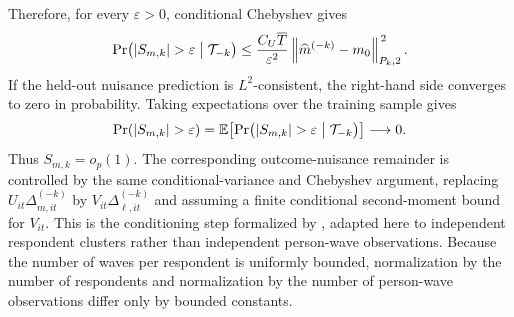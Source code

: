 \documentclass[11pt,oneside,a4paper]{book}
\begin{document}
Therefore, for every \(\varepsilon>0\), conditional Chebyshev gives
\begin{equation}
\Pr\!\left(
\lvert S_{m,k}\rvert>\varepsilon
\bigm|\mathcal{T}_{-k}
\right)
\leq
\frac{C_U\overline{T}}{\varepsilon^2}
\left\|
\widehat{m}^{(-k)}-m_0
\right\|_{P_k,2}^{\,2}.
\label{eq:crossfit_chebyshev_m}
\end{equation}
If the held-out nuisance prediction is \(L^2\)-consistent, the right-hand side converges to zero in probability. Taking expectations over the training sample gives
\begin{equation}
\Pr\!\left(\lvert S_{m,k}\rvert>\varepsilon\right)
=
\mathbb{E}\!\left[
\Pr\!\left(
\lvert S_{m,k}\rvert>\varepsilon
\bigm|\mathcal{T}_{-k}
\right)
\right]
\longrightarrow 0.
\label{eq:crossfit_unconditional_convergence}
\end{equation}
Thus \(S_{m,k}=o_p(1)\). The corresponding outcome-nuisance remainder is controlled by the same conditional-variance and Chebyshev argument, replacing \(U_{it}\Delta^{(-k)}_{m,it}\) by \(V_{it}\Delta^{(-k)}_{\ell,it}\) and assuming a finite conditional second-moment bound for \(V_{it}\). This is the conditioning step formalized by \citet[Appendix, p.~C50, Lemma~6.1, titled \emph{Conditional convergence implies unconditional}; pp.~C55--C56]{chernozhukov2018dml}, adapted here to independent respondent clusters rather than independent person-wave observations. Because the number of waves per respondent is uniformly bounded, normalization by the number of respondents and normalization by the number of person-wave observations differ only by bounded constants.
\end{document}
